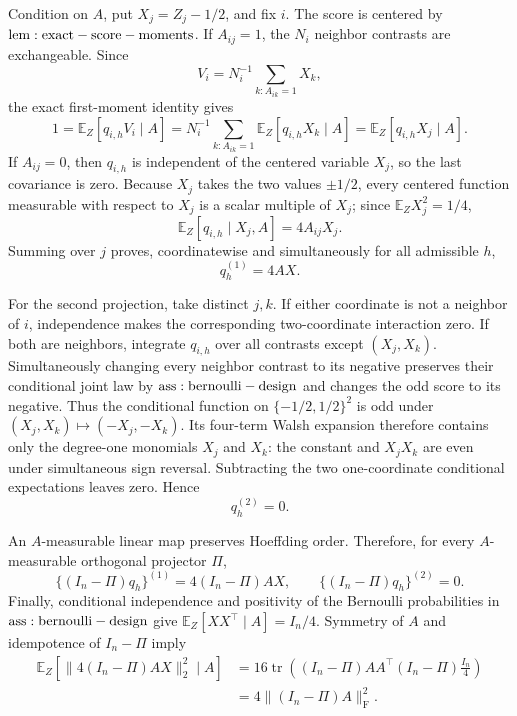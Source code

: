 Condition on \(A\), put \(X_j=Z_j-1/2\), and fix \(i\).  The score is centered by \({\rm lem:exact-score-moments}\).  If \(A_{ij}=1\), the \(N_i\) neighbor contrasts are exchangeable.  Since
\[
 V_i=N_i^{-1}\sum_{k:A_{ik}=1}X_k,
\]
the exact first-moment identity gives
\[
 1=\mathbb E_Z[q_{i,h}V_i\mid A]
 =N_i^{-1}\sum_{k:A_{ik}=1}\mathbb E_Z[q_{i,h}X_k\mid A]
 =\mathbb E_Z[q_{i,h}X_j\mid A].
\]
If \(A_{ij}=0\), then \(q_{i,h}\) is independent of the centered variable \(X_j\), so the last covariance is zero.  Because \(X_j\) takes the two values \(\pm1/2\), every centered function measurable with respect to \(X_j\) is a scalar multiple of \(X_j\); since \(\mathbb E_ZX_j^2=1/4\),
\[
 \mathbb E_Z[q_{i,h}\mid X_j,A]=4A_{ij}X_j.
\]
Summing over \(j\) proves, coordinatewise and simultaneously for all admissible \(h\),
\[
 q_h^{(1)}=4AX.
\]

For the second projection, take distinct \(j,k\).  If either coordinate is not a neighbor of \(i\), independence makes the corresponding two-coordinate interaction zero.  If both are neighbors, integrate \(q_{i,h}\) over all contrasts except \((X_j,X_k)\).  Simultaneously changing every neighbor contrast to its negative preserves their conditional joint law by \({\rm ass:bernoulli-design}\) and changes the odd score to its negative.  Thus the conditional function on \(\{-1/2,1/2\}^2\) is odd under \((X_j,X_k)\mapsto(-X_j,-X_k)\).  Its four-term Walsh expansion therefore contains only the degree-one monomials \(X_j\) and \(X_k\): the constant and \(X_jX_k\) are even under simultaneous sign reversal.  Subtracting the two one-coordinate conditional expectations leaves zero.  Hence
\[
 q_h^{(2)}=0.
\]

An \(A\)-measurable linear map preserves Hoeffding order.  Therefore, for every \(A\)-measurable orthogonal projector \(\Pi\),
\[
 \{(I_n-\Pi)q_h\}^{(1)}=4(I_n-\Pi)AX,
 \qquad \{(I_n-\Pi)q_h\}^{(2)}=0.
\]
Finally, conditional independence and positivity of the Bernoulli probabilities in \({\rm ass:bernoulli-design}\) give \(\mathbb E_Z[XX^\top\mid A]=I_n/4\).  Symmetry of \(A\) and idempotence of \(I_n-\Pi\) imply
\[
\begin{aligned}
 \mathbb E_Z\!\left[\|4(I_n-\Pi)AX\|_2^2\mid A\right]
 &=16\operatorname{tr}\!\left((I_n-\Pi)AA^\top(I_n-\Pi)\frac{I_n}{4}\right)\\
 &=4\|(I_n-\Pi)A\|_{\mathrm F}^2.
\end{aligned}
\]